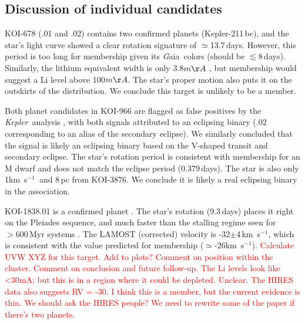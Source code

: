 \documentclass[twocolumn]{aastex631}
\newcommand{\starname}{KOI-3876}
\newcommand{\kepler}{{\it Kepler}}
\newcommand\kms{km~s$^{-1}$}
\newcommand{\gaia}{{\textit Gaia}}
\begin{document}
\subsection{Discussion of individual candidates}

KOI-678 (.01 and .02) contains two confirmed planets (Kepler-211\,bc), and the star's light curve showed a clear rotation signature of $\simeq$13.7\,days. However, this period is too long for membership given its \gaia\ colors (should be $\lesssim$8\,days). Similarly, the lithium equivalent width is only 3.8$m\AA$ \citep{2018ApJ...855..115B}, but membership would suggest a Li level above 100$m\AA$. The star's proper motion also puts it on the outskirts of the distribution. We conclude this target is unlikely to be a member. 

Both planet candidates in KOI-966 are flagged as false positives by the \kepler\ analysis \citep{2016ApJS..224...12C}, with both signals attributed to an eclipsing binary (.02 corresponding to an alias of the secondary eclipse). We similarly concluded that the signal is likely an eclipsing binary based on the V-shaped transit and secondary eclipse. The star's rotation period \citep[3.92\,days;][]{2013MNRAS.436.1883W} is consistent with membership for an M dwarf and does not match the eclipse period (0.379\,days). The star is also only 1\kms\ and 8\,pc from \starname. We conclude it is likely a real eclipsing binary in the association.

KOI-1838.01 is a confirmed planet \citep[Kepler-970 b;][]{2016ApJ...822...86M}. The star's rotation (9.3\,days) places it right on the Pleiades sequence, and much faster than the stalling regime seen for $>600$\,Myr systems \citep{Curtis_stall}. The LAMOST (corrected) velocity is -32$\pm$4\,\kms, which is consistent with the value predicted for membership ($\simeq$-26\kms). \textcolor{red}{Calculate UVW XYZ for this target. Add to plots? Comment on position within the cluster. Comment on conclusion and future follow-up. The Li levels look like <30mA; but this is in a region where it could be depleted. Unclear. The HIRES data also suggests RV = -30. I think this is a member, but the current evidence is thin. We should ask the HIRES people? We need to rewrite some of the paper if there's two planets.  }

\end{document}
